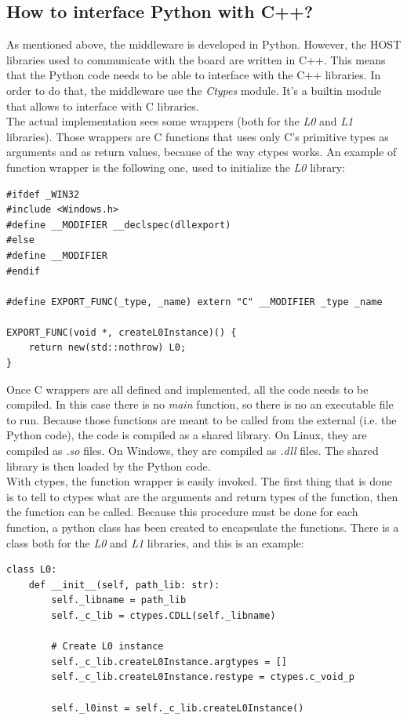 \subsection{How to interface Python with C++?}
As mentioned above, the middleware is developed in Python. However, the HOST libraries used to communicate with the board are written in C++. This means that the Python code needs to be able to interface with the C++ libraries. In order to do that, the middleware use the \textit{Ctypes} module. It's a builtin module that allows to interface with C libraries.\\

The actual implementation sees some wrappers (both for the \textit{L0} and \textit{L1} libraries). Those wrappers are C functions that uses only C's primitive types as arguments and as return values, because of the way ctypes works. An example of function wrapper is the following one, used to initialize the \textit{L0} library:

\begin{lstlisting}[style=CStyle]
#ifdef _WIN32
#include <Windows.h>
#define __MODIFIER __declspec(dllexport)
#else
#define __MODIFIER 
#endif

#define EXPORT_FUNC(_type, _name) extern "C" __MODIFIER _type _name

EXPORT_FUNC(void *, createL0Instance)() {
    return new(std::nothrow) L0;
}

\end{lstlisting}

Once C wrappers are all defined and implemented, all the code needs to be compiled. In this case there is no \textit{main} function, so there is no an executable file to run. Because those functions are meant to be called from the external (i.e. the Python code), the code is compiled as a shared library. On Linux, they are compiled as \textit{.so} files. On Windows, they are compiled as \textit{.dll} files. The shared library is then loaded by the Python code.\\

With ctypes, the function wrapper is easily invoked. The first thing that is done is to tell to ctypes what are the arguments and return types of the function, then the function can be called. Because this procedure must be done for each function, a python class has been created to encapsulate the functions. There is a class both for the \textit{L0} and \textit{L1} libraries, and this is an example:

\begin{lstlisting}[style=PyStyle]
class L0:
    def __init__(self, path_lib: str):
        self._libname = path_lib
        self._c_lib = ctypes.CDLL(self._libname)

        # Create L0 instance
        self._c_lib.createL0Instance.argtypes = []
        self._c_lib.createL0Instance.restype = ctypes.c_void_p

        self._l0inst = self._c_lib.createL0Instance()
\end{lstlisting}

